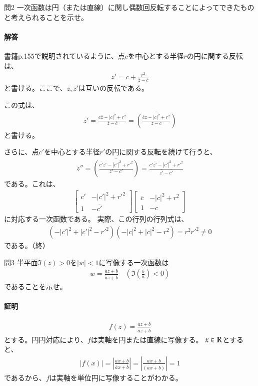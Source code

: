 \newpage
\begin{mysimplebox}{問2}
    一次函数は円（または直線）に関し偶数回反転することによってできたものと考えられることを示せ。
\end{mysimplebox}
\paragraph{解答}
書籍p.155で説明されているように、点$c$を中心とする半径$r$の円に関する反転は、
\begin{align*}
    z'=c+\frac{r^2}{\overline{z}-\overline{c}}
\end{align*}
と書ける。ここで、$z,z'$は互いの反転である。

この式は、
\begin{align*}
    z'=\frac{c\overline{z}-|c|^2+r^2}{\overline{z}-\overline{c}}
    =\overline{\left(\frac{\overline{c}z-|c|^2+r^2}{z-c}\right)}
\end{align*}
と書ける。

さらに、点$c'$を中心とする半径$r'$の円に関する反転を続けて行うと、
\begin{align*}
    z''=\overline{\left(\frac{\overline{c'}z'-|c'|^2+r'^2}{z'-c'}\right)}
    =\frac{c'\overline{z'}-|c'|^2+r'^2}{\overline{z'}-\overline{c'}}
\end{align*}
である。これは、
\begin{align*}
    \begin{bmatrix}
        c'&-|c'|^2+r'^2\\
        1&-\overline{c'}
    \end{bmatrix}
    \begin{bmatrix}
        \overline{c}&-|c|^2+r^2\\
        1&-c
    \end{bmatrix}
\end{align*}
に対応する一次函数である。
実際、この行列の行列式は、
\begin{align*}
    (-|c'|^2+|c'|^2-r'^2)(-|c|^2+|c|^2-r^2)=r^2r'^2\neq0
\end{align*}
である。（終）

\newpage
\begin{mysimplebox}{問3}
    半平面$\Im(z)>0$を$|w|<1$に写像する一次函数は
    \begin{align*}
        w=\frac{az+b}{\overline{a}z+\overline{b}}
        \quad\left(\Im\left(\frac{b}{a}\right)<0\right)
    \end{align*}
    であることを示せ。
\end{mysimplebox}
\paragraph{証明}
\begin{align*}
    f(z)=\frac{az+b}{\overline{a}z+\overline{b}}
\end{align*}
とする。円円対応により、$f$は実軸を円または直線に写像する。
$x\in\mathbb{R}$とすると、
\begin{align*}
    \left|f(x)\right|
    =\left|\frac{ax+b}{\overline{a}x+\overline{b}}\right|
    =\left|\frac{ax+b}{\overline{(ax+b)}}\right|
    =1
\end{align*}
であるから、$f$は実軸を単位円に写像することがわかる。

